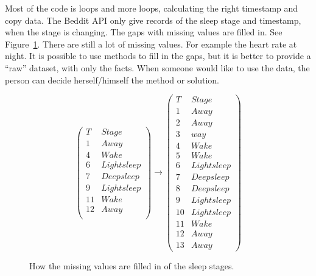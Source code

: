 
			Most of the code is loops and more loops, calculating the right timestamp and copy data. 
			The Beddit API only give records of the sleep stage and timestamp, when the stage is changing. The gaps with missing values are filled in. See Figure~\ref{fig:missingvalues}. There are still a lot of missing values. For example the heart rate at night. It is possible to use methods to fill in the gaps, but it is better to provide a ``raw'' dataset, with only the facts. When someone would like to use the data, the person can decide herself/himself the method or solution.
			\begin{figure}[h!]
			\[ 
				\left(
				\begin{array}{rc}
				T & Stage \\ \hline
				1 & Away \\
				4 & Wake \\
				6 & Light sleep \\
				7 & Deep sleep \\
				9 & Light sleep \\
				11 & Wake \\
				12 & Away \\
				\end{array}
				\right)
				\to
				\left(
				\begin{array}{rc}
				T & Stage \\ \hline
				1 & Away \\
				2 & Away \\
				3 & way \\
				4 & Wake \\
				5 & Wake \\
				6 & Light sleep \\
 				7 & Deep sleep \\
				8 & Deep sleep \\
				9 & Light sleep \\
				10 & Light sleep \\
				11 & Wake \\
				12 & Away \\
				13 & Away 
				\end{array}
				\right)
			\] 
			\caption{How the missing values are filled in of the sleep stages.}
			\label{fig:missingvalues}
		\end{figure}
		





